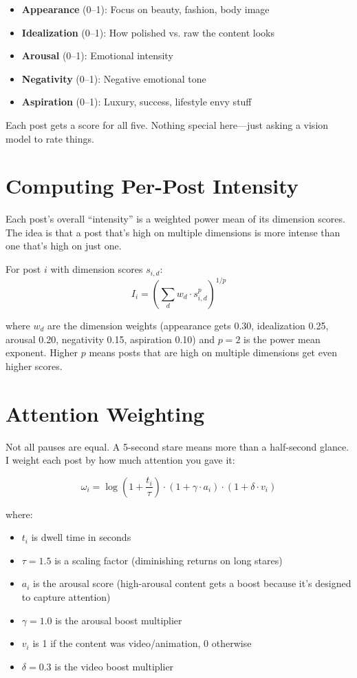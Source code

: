 \documentclass[11pt]{article}
\begin{document}
\begin{itemize}
    \item \textbf{Appearance} (0--1): Focus on beauty, fashion, body image
    \item \textbf{Idealization} (0--1): How polished vs. raw the content looks
    \item \textbf{Arousal} (0--1): Emotional intensity
    \item \textbf{Negativity} (0--1): Negative emotional tone
    \item \textbf{Aspiration} (0--1): Luxury, success, lifestyle envy stuff
\end{itemize}

Each post gets a score for all five. Nothing special here—just asking a vision model to rate things.

\section{Computing Per-Post Intensity}

Each post's overall ``intensity'' is a weighted power mean of its dimension scores. The idea is that a post that's high on multiple dimensions is more intense than one that's high on just one.

For post $i$ with dimension scores $s_{i,d}$:
\[
I_i = \left( \sum_{d} w_d \cdot s_{i,d}^p \right)^{1/p}
\]

where $w_d$ are the dimension weights (appearance gets 0.30, idealization 0.25, arousal 0.20, negativity 0.15, aspiration 0.10) and $p = 2$ is the power mean exponent. Higher $p$ means posts that are high on multiple dimensions get even higher scores.

\section{Attention Weighting}

Not all pauses are equal. A 5-second stare means more than a half-second glance. I weight each post by how much attention you gave it:

\[
\omega_i = \log\left(1 + \frac{t_i}{\tau}\right) \cdot (1 + \gamma \cdot a_i) \cdot (1 + \delta \cdot v_i)
\]

where:
\begin{itemize}
    \item $t_i$ is dwell time in seconds
    \item $\tau = 1.5$ is a scaling factor (diminishing returns on long stares)
    \item $a_i$ is the arousal score (high-arousal content gets a boost because it's designed to capture attention)
    \item $\gamma = 1.0$ is the arousal boost multiplier
    \item $v_i$ is 1 if the content was video/animation, 0 otherwise
    \item $\delta = 0.3$ is the video boost multiplier
\end{itemize}
\end{document}
